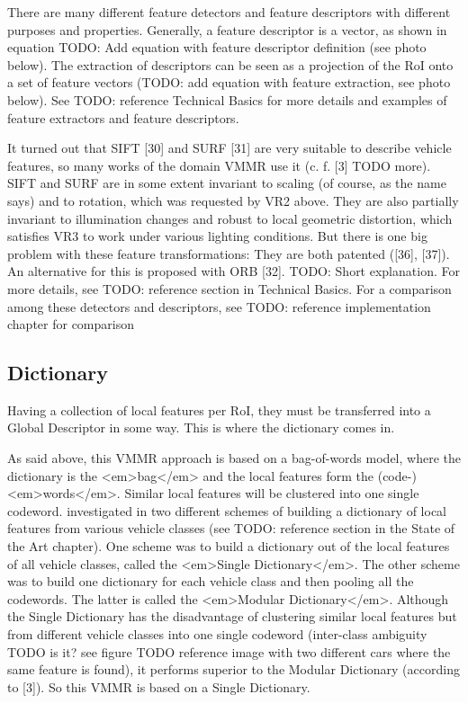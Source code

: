 There are many different feature detectors and feature descriptors with different purposes and properties. Generally, a feature descriptor is a vector, as shown in equation TODO: Add equation with feature descriptor definition (see photo below). The extraction of descriptors can be seen as a projection of the RoI onto a set of feature vectors (TODO: add equation with feature extraction, see photo below). See TODO: reference Technical Basics for more details and examples of feature extractors and feature descriptors.

It turned out that SIFT [30] and SURF [31] are very suitable to describe vehicle features, so many works of the domain VMMR use it (c. f. [3] TODO more). SIFT and SURF are in some extent invariant to scaling (of course, as the name says) and to rotation, which was requested by VR2 above. They are also partially invariant to illumination changes and robust to local geometric distortion, which satisfies VR3 to work under various lighting conditions. But there is one big problem with these feature transformations: They are both patented ([36], [37]). An alternative for this is proposed with ORB [32]. TODO: Short explanation. For more details, see TODO: reference section in Technical Basics. For a comparison among these detectors and descriptors, see TODO: reference implementation chapter for comparison

\subsection{Dictionary}
Having a collection of local features per RoI, they must be transferred into a Global Descriptor in some way. This is where the dictionary comes in.

As said above, this VMMR approach is based on a bag-of-words model, where the dictionary is the <em>bag</em> and the local features form the (code-)<em>words</em>. Similar local features will be clustered into one single codeword. \citeauthor{siddiqui2015robust} \citep{siddiqui2015robust} investigated in two different schemes of building a dictionary of local features from various vehicle classes (see TODO: reference section in the State of the Art chapter). One scheme was to build a dictionary out of the local features of all vehicle classes, called the <em>Single Dictionary</em>. The other scheme was to build one dictionary for each vehicle class and then pooling all the codewords. The latter is called the <em>Modular Dictionary</em>. Although the Single Dictionary has the disadvantage of clustering similar local features but from different vehicle classes into one single codeword (inter-class ambiguity TODO is it? see figure TODO reference image with two different cars where the same feature is found), it performs superior to the Modular Dictionary (according to [3]). So this VMMR is based on a Single Dictionary.

